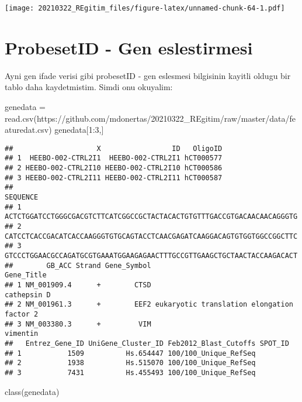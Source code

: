 \documentclass[
]{book}
\newenvironment{Shaded}{\begin{snugshade}}{\end{snugshade}}
\newcommand{\DecValTok}[1]{\textcolor[rgb]{0.00,0.00,0.81}{#1}}
\newcommand{\FunctionTok}[1]{\textcolor[rgb]{0.00,0.00,0.00}{#1}}
\newcommand{\NormalTok}[1]{#1}
\newcommand{\OtherTok}[1]{\textcolor[rgb]{0.56,0.35,0.01}{#1}}
\newcommand{\SpecialCharTok}[1]{\textcolor[rgb]{0.00,0.00,0.00}{#1}}
\newcommand{\StringTok}[1]{\textcolor[rgb]{0.31,0.60,0.02}{#1}}
\begin{document}
\texttt{[image: 20210322\_REgitim\_files/figure-latex/unnamed-chunk-64-1.pdf]}

\hypertarget{probesetid---gen-eslestirmesi}{%
\section{ProbesetID - Gen eslestirmesi}\label{probesetid---gen-eslestirmesi}}

Ayni gen ifade verisi gibi probesetID - gen eslesmesi bilgisinin kayitli oldugu bir tablo daha kaydetmistim. Simdi onu okuyalim:

\begin{Shaded}
\begin{Highlighting}[]
\NormalTok{genedata }\OtherTok{=} \FunctionTok{read.csv}\NormalTok{(}\StringTok{\textquotesingle{}https://github.com/mdonertas/20210322\_REgitim/raw/master/data/featuredat.csv\textquotesingle{}}\NormalTok{)}
\NormalTok{genedata[}\DecValTok{1}\SpecialCharTok{:}\DecValTok{3}\NormalTok{,]}
\end{Highlighting}
\end{Shaded}

\begin{verbatim}
##                    X                 ID   OligoID
## 1  HEEBO-002-CTRL2I1  HEEBO-002-CTRL2I1 hCT000577
## 2 HEEBO-002-CTRL2I10 HEEBO-002-CTRL2I10 hCT000586
## 3 HEEBO-002-CTRL2I11 HEEBO-002-CTRL2I11 hCT000587
##                                                                 SEQUENCE
## 1 ACTCTGGATCCTGGGCGACGTCTTCATCGGCCGCTACTACACTGTGTTTGACCGTGACAACAACAGGGTG
## 2 CATCCTCACCGACATCACCAAGGGTGTGCAGTACCTCAACGAGATCAAGGACAGTGTGGTGGCCGGCTTC
## 3 GTCCCTGGAACGCCAGATGCGTGAAATGGAAGAGAACTTTGCCGTTGAAGCTGCTAACTACCAAGACACT
##        GB_ACC Strand Gene_Symbol                                 Gene_Title
## 1 NM_001909.4      +        CTSD                                cathepsin D
## 2 NM_001961.3      +        EEF2 eukaryotic translation elongation factor 2
## 3 NM_003380.3      +         VIM                                   vimentin
##   Entrez_Gene_ID UniGene_Cluster_ID Feb2012_Blast_Cutoffs SPOT_ID
## 1           1509          Hs.654447 100/100_Unique_RefSeq        
## 2           1938          Hs.515070 100/100_Unique_RefSeq        
## 3           7431          Hs.455493 100/100_Unique_RefSeq
\end{verbatim}

\begin{Shaded}
\begin{Highlighting}[]
\FunctionTok{class}\NormalTok{(genedata)}
\end{Highlighting}
\end{Shaded}
\end{document}
